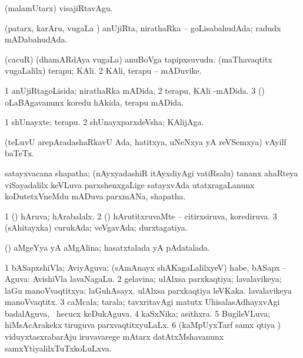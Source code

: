 \noindent 
\gl{\akirx}
\expl{}
\bmng
 (malamUtarx) visajiRtavAgu. 
\emng
\eentry

\bentry 
{} 
\gl{\gu}
\expl{}
\bmng
 (patarx, karAru, \mo vugaLa \vi) anUjiRta, nirathaRka -- goLisabahudAda; radudx mADabahudAda. 
\emng
\eentry

\bentry 
{} 
\gl{\nA}
\expl{}
\bmng
\bnum
{} 
\banum
{} (cacuR) (dhamARdAya \mo vugaLa) anuBoVga tapipxsuvudu. 
 (maThavaqtitx \mo vugaLalilx) terapu; KAli. 
\eanum
\numie
\num{2} KAli, terapu -- mADuvike. 
\enum
\emng
\eentry

\bentry
{} 
\gl{\gu}
\expl{}
\bmng
\bnum
\num{1} anUjiRtagoLisida; nirathaRka mADida. 
\num{2} terapu, KAli -mADida. 
\num{3} (\vaMlAM) oLaBAgavanunx koredu hAkida, terapu mADida. 
\enum
\emng
\eentry

\bentry
{} 
\gl{\nA}
\expl{}
\bmng
\bnum
\num{1} shUnayxte; terapu. 
\num{2} shUnayxparxdeVsha; KAlijAga. 
\enum
\emng
\eentry

\bentry
{} 
\gl{\nA}
\expl{}
\bmng
 (teLuvU arepAradashaRkavU Ada, hatitxya, uNeNxya yA reVSemxya) vAyilf baTeTx. 
\emng
\eentry

\bentry 
{} 
\gl{\nA}
\expl{\F\ }
\bmng
satayxvacana shapatha; (nAyxyadashiR itAyxdiyAgi vatiRsalu) tananx ahaRteya viSayadalilx keVLuva parxshenxgaLige satayxvAda utatxragaLanunx koDutetxVneMdu mADuva parxmANa, shapatha. 
\emng
\eentry

\bentry 
{}
\gl{\saMkiSx}
\expl{}
\bmng
\emng
\eentry

\bentry 
{} 
\gl{\gu}
\expl{}
\bmng
\bnum
\num{1} (\pArxvi) hAruva; hArabalalx. 
\num{2} (\vaMlAM) hArutitxruvaMte -- citirxsiruva, korediruva. 
\num{3} (sAhitayxka) curukAda; veVgavAda; durxtagatiya. 
\enum
\emng
\eentry

\bentry
{} 
\gl{\gu}
\expl{}
\bmng
 (\aMrashA) aMgeYya yA aMgAlina; hasatxtalada yA pAdatalada. 
\emng
\eentry

\bentry 
{} 
\gl{\gu}
\expl{}
\bmng
\bnum
\num{1} bASapxshiVla; AviyAguva; (sAmAnayx shAKagaLalilxyeV) habe, bASapx -- Aguva:  AvishiVla lavaNagaLu. 
\num{2} gelavina; ulAlxsa parxkaqtiya; lavalavikeya; laGu manoVvaqtitxya:  laGuhAsayx.  ulAlxsa parxkaqtiya leVKaka.  lavalavikeya manoVvaqtitx. 
\num{3} caMcala; tarala; tavxritavAgi matutx UhisalasAdhayxvAgi badalAguva, \kanmu\ hecucx keDukAguva. 
\num{4} kaSxNika; asithxra. 
\num{5} BugileVLuva; hiMsAcArakekx tiruguva parxvaqtitxyuLaLx. 
\num{6} (kaMpUyxTarf samx qtiya \vi) viduyxtasxrabarAju iruvavarege mAtarx datAtxMshavanunx samxYtiyalilxTuTxkoLuLxva. 
\enum
\emng
\eentry

